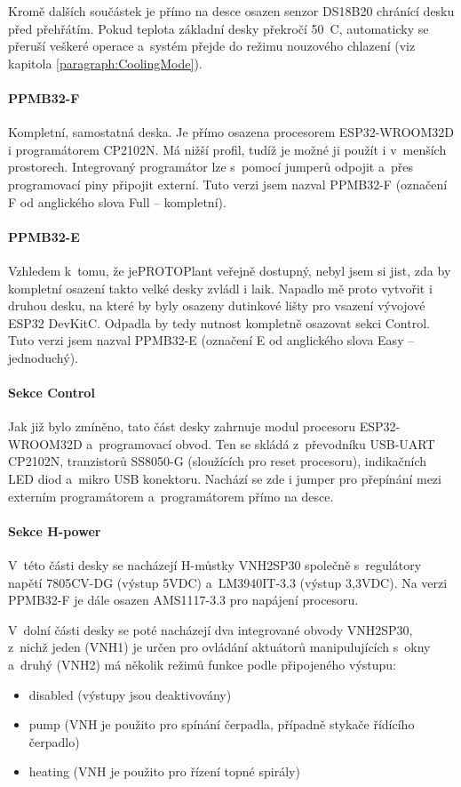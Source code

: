 Kromě dalších součástek je přímo na desce osazen senzor DS18B20 chránící desku před přehřátím. 
Pokud teplota základní desky překročí 50~\degree C, automaticky se přeruší veškeré operace a~systém přejde do režimu nouzového chlazení (viz kapitola \ref{paragraph:CoolingMode}).

\paragraph{PPMB32-F}
Kompletní, samostatná deska. 
Je přímo osazena procesorem ESP32-WROOM32D i programátorem CP2102N. 
Má nižší profil, tudíž je možné ji použít i v~menších prostorech.
Integrovaný programátor lze s~pomocí jumperů odpojit a~přes programovací piny připojit externí. Tuto verzi jsem nazval PPMB32-F (označení F od anglického slova Full -- kompletní).

\paragraph{PPMB32-E}
Vzhledem k~tomu, že jePROTOPlant veřejně dostupný, nebyl jsem si jist, zda by kompletní osazení takto velké desky zvládl i laik. 
Napadlo mě proto vytvořit i druhou desku, na které by byly osazeny dutinkové lišty pro vsazení vývojové ESP32 DevKitC. 
Odpadla by tedy nutnost kompletně osazovat sekci Control. 
Tuto verzi jsem nazval PPMB32-E (označení E od anglického slova Easy -- jednoduchý).

\paragraph{Sekce Control}
Jak již bylo zmíněno, tato část desky zahrnuje modul procesoru ESP32-WROOM32D a~programovací obvod. 
Ten se skládá z~převod\-ní\-ku USB-UART CP2102N, tranzistorů SS8050-G (sloužících pro reset procesoru), indikačních LED diod a~mikro USB konektoru. 
Nachází se zde i jumper pro přepínání mezi externím programátorem a~programátorem přímo na desce.

\paragraph{Sekce H-power}
V~této části desky se nacházejí H-můstky VNH2SP30 společně s~regulátory napětí 7805CV-DG (výstup 5VDC) a~LM3940IT-3.3 (výstup 3,3VDC). 
Na verzi PPMB32-F je dále osazen AMS1117-3.3 pro napájení procesoru. 

V~dolní části desky se poté nacházejí dva integrované obvody VNH2SP30, z~nichž jeden (VNH1) je určen pro ovládání aktuátorů manipulujících s~okny a~druhý 
(VNH2) má několik režimů funkce podle připojeného výstupu:
\begin{itemize}
    \item disabled (výstupy jsou deaktivovány)
    \item pump (VNH je použito pro spínání čerpadla, případně stykače řídícího čerpadlo)
    \item heating (VNH je použito pro řízení topné spirály)
\end{itemize}

